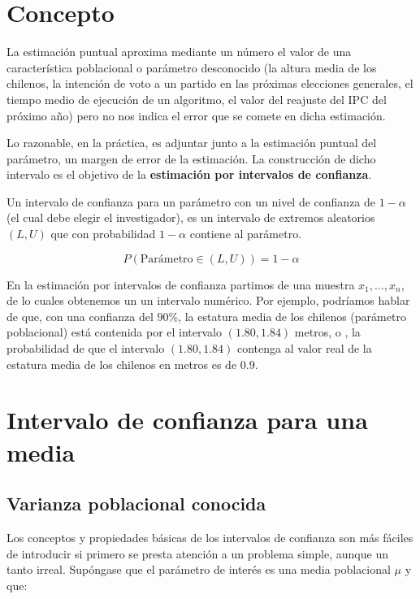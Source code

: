 \documentclass[
  11pt,
]{book}
\theoremstyle{definition}
\theoremstyle{definition}
\theoremstyle{definition}
\theoremstyle{definition}
\theoremstyle{remark}
\begin{document}
\section{Concepto}\label{intervalos-de-confianza-concepto}

La estimación puntual aproxima mediante un número el valor de una característica poblacional o parámetro desconocido (la altura media de los chilenos, la intención de voto a un partido en las próximas elecciones generales, el tiempo medio de ejecución de un algoritmo, el valor del reajuste del IPC del próximo año) pero no nos indica el error que se comete en dicha estimación. \citep[página 254]{Devore}

Lo razonable, en la práctica, es adjuntar junto a la estimación puntual del parámetro, un margen de error de la estimación. La construcción de dicho intervalo es el objetivo de la \textbf{estimación por intervalos de confianza}.

Un intervalo de confianza para un parámetro con un nivel de confianza de \(1-\alpha\) (el cual debe elegir el investigador), es un intervalo de extremos aleatorios \((L,U)\) que con probabilidad \(1-\alpha\) contiene al parámetro.

\[
P(\text{Parámetro} \in (L,U)) = 1-\alpha
\]

En la estimación por intervalos de confianza partimos de una muestra \(x_1,\ldots,x_n\), de lo cuales obtenemos un un intervalo numérico. Por ejemplo, podríamos hablar de que, con una confianza del \(90\%\), la estatura media de los chilenos (parámetro poblacional) está contenida por el intervalo \((1.80, 1.84)\) metros, o , la probabilidad de que el intervalo \((1.80,1.84)\) contenga al valor real de la estatura media de los chilenos en metros es de \(0.9\).

\section{Intervalo de confianza para una media}\label{intervalo-de-confianza-para-la-media}

\subsection{Varianza poblacional conocida}\label{intervalo-de-confianza-para-la-media-varianza-conocida}

Los conceptos y propiedades básicas de los intervalos de confianza son más fáciles de introducir si primero se presta atención a un problema simple, aunque un tanto irreal. Supóngase que el parámetro de interés es una media poblacional \(\mu\) y que:
\end{document}
